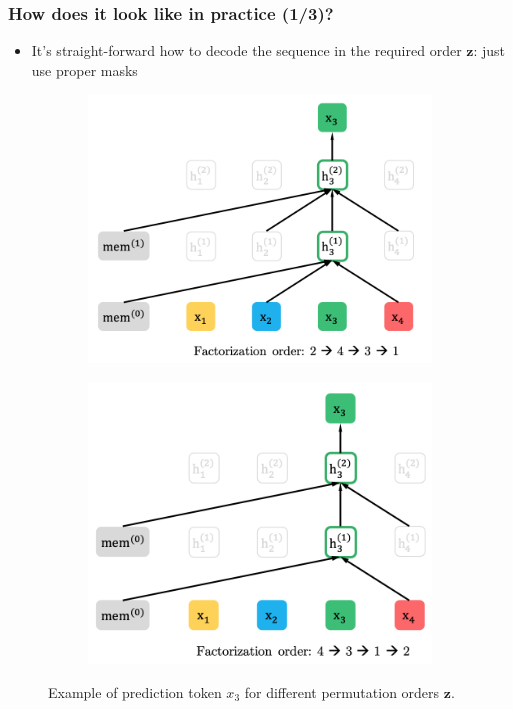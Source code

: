 \documentclass[10pt]{beamer}
\begin{document}
\begin{frame}
    \frametitle{How does it look like in practice (1/3)?}

    \begin{itemize}
        \item\pause It's straight-forward how to decode the sequence in the required order $\bm z$: just use proper masks
    \end{itemize}
\pause
\begin{figure}
    \centering
    \begin{subfigure}[b]{0.49\textwidth}
        \includegraphics[width=\textwidth]{images/order-example-1.png}
    \end{subfigure}
    \begin{subfigure}[b]{0.49\textwidth}
        \includegraphics[width=\textwidth]{images/order-example-2.png}
    \end{subfigure}
    \caption{Example of prediction token $x_3$ for different permutation orders $\bm z$.}
\end{figure}
\end{frame}
\end{document}
